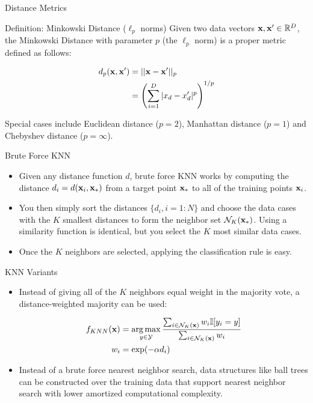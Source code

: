 \documentclass[serif,xcolor=pdftex,dvipsnames,table,hyperref={bookmarks=false}]{beamer}
\begin{document}
\begin{frame}[t]{Distance Metrics}

\begin{block}{Definition: Minkowski Distance ($\ell_p$ norms)}
Given two data vectors ${\mathbf{x}},{\mathbf{x}}' \in \mathbb{R}^D$, the Minkowski Distance with parameter $p$ (the $\ell_p$ norm) is a proper metric defined as follows:

\begin{align*}
d_p({\mathbf{x}},{\mathbf{x}}') &=  ||{\mathbf{x}}-{\mathbf{x}}'||_p \\
&=\left(\sum_{i=1}^D |x_d-x'_d|^p\right)^{1/p}
\end{align*}
\end{block}
\pause Special cases include Euclidean distance ($p=2$), Manhattan distance ($p=1$) and Chebyshev distance ($p=\infty$).

\end{frame}

\begin{frame}[t]{Brute Force KNN}

\begin{itemize}
\item Given any distance function $d$, brute force KNN works by computing the distance $d_i = d({\mathbf{x}}_i,{\mathbf{x}}_*)$ from a target point ${\mathbf{x}}_*$ to all of the training points ${\mathbf{x}}_i$.

\pause \item You then simply sort the distances $\{d_i,i=1:N\}$ and choose the data cases with the $K$ smallest distances to form the neighbor set $\mathcal{N}_K({\mathbf{x}}_*)$. Using a similarity function is identical, but you select the $K$ most similar data cases. 

\pause \item Once the $K$ neighbors are selected, applying the classification rule is easy.
\end{itemize}

\end{frame}

\begin{frame}[t]{KNN Variants}

\begin{itemize}
\item Instead of giving all of the $K$ neighbors equal weight in the majority vote, a distance-weighted majority can be used:

\begin{align*}
f_{KNN}({\mathbf{x}}) &= \operatorname*{arg\,max}_{y\in\mathcal{Y}} \frac{\sum_{i\in \mathcal{N}_K({\mathbf{x}})} w_i \mathbb{I}[y_i=y]}
{\sum_{i\in \mathcal{N}_K({\mathbf{x}})} w_i}\\
w_i &= \exp(-\alpha d_i)
\end{align*}

\pause
\item Instead of a brute force nearest neighbor search, data structures like ball trees can be constructed over the training data that support nearest neighbor search with lower amortized computational complexity.

\end{itemize}

\end{frame}
\end{document}
